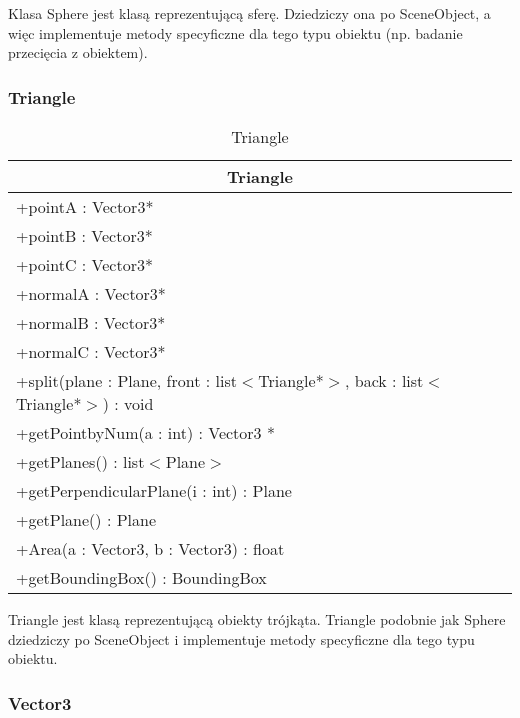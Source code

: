 Klasa Sphere jest klasą reprezentującą sferę. Dziedziczy ona po SceneObject, a więc implementuje metody specyficzne dla tego typu obiektu (np. badanie przecięcia z obiektem).

\subsubsection{Triangle}

\footnotesize
\begin{longtable}{|p{14cm}|}
    \caption{Triangle} \label{tab:Triangle} \\ \hline
    \multicolumn{1}{|c|}{Triangle} \\ \hline
    +pointA : Vector3* \\
    +pointB : Vector3* \\
    +pointC : Vector3* \\
    +normalA : Vector3* \\
    +normalB : Vector3* \\
    +normalC : Vector3* \\
    \hline
	+split(plane : Plane, front : list$<$Triangle*$>$, back : list$<$Triangle*$>$) : void \\ 
	+getPointbyNum(a : int) : Vector3 * \\
	+getPlanes() : list$<$Plane$>$ \\
	+getPerpendicularPlane(i : int) : Plane \\
	+getPlane() : Plane \\
	+Area(a : Vector3, b : Vector3) : float \\
	+getBoundingBox() : BoundingBox \\
	\hline
\end{longtable}
\normalsize

Triangle jest klasą reprezentującą obiekty trójkąta. Triangle podobnie jak Sphere dziedziczy po SceneObject i implementuje metody specyficzne dla tego typu obiektu.

\subsubsection{Vector3}

